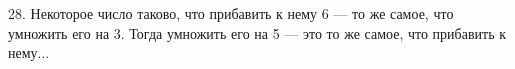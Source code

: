 28. Некоторое число таково, что прибавить к нему 6 --- то же самое, что умножить его на 3. Тогда умножить его на 5 --- это то же самое, что прибавить к нему...\\
